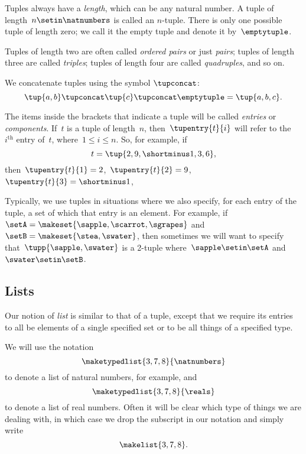 Tuples always have a \emph{length}, which can be any natural number.
A tuple of length~$n \setin \natnumbers$ is called an $n$-tuple.
There is only one possible tuple of length zero; we call it the empty tuple and denote it by~$\emptytuple$.

Tuples of length two are often called \emph{ordered pairs} or just \emph{pairs};
tuples of length three are called \emph{triples};
tuples of length four are called \emph{quadruples}, and so on.

We concatenate tuples using the symbol $\tupconcat$:
\begin{equation}
    \tup{a,b} \tupconcat \tup{c} \tupconcat \emptytuple = \tup{a,b,c}.
\end{equation}

The items inside the brackets that indicate a tuple will be called \emph{entries} or \emph{components}.
If~$t$ is a tuple of length~$n$, then~$\tupentry{t}{i}$ will refer to the~$i^{\text{th}}$ entry of~$t$, where~$1 \leq i \leq n$.
So, for example, if
\begin{equation}
    t = \tup{2,9,\shortminus1, 3, 6},
\end{equation}
then~$\tupentry{t}{1} = 2$,~$\tupentry{t}{2} = 9$,~$\tupentry{t}{3} = \shortminus1$, \etc

Typically, we use tuples in situations where we also specify, for each entry of the tuple, a set of which that entry is an element.
For example, if~$\setA = \makeset{ \sapple, \scarrot, \sgrapes}$ and~$\setB = \makeset{ \stea, \swater }$, then sometimes we will want to specify that~$\tupp{\sapple, \swater}$ is a 2-tuple where~$\sapple \setin\setA$ and~$\swater \setin\setB$.


\subsection{Lists}
\label{sec:lists}

Our notion of \emph{list} is similar to that of a tuple, except that we require its entries to all be elements of a single specified set or to be all things of a specified type.

We will use the notation
\begin{equation}
    \maketypedlist{3, 7, 8}{\natnumbers}
\end{equation}
to denote a list of natural numbers, for example, and
\begin{equation}
    \maketypedlist{3, 7, 8}{\reals}
\end{equation}
to denote a list of real numbers.
Often it will be clear which type of things we are dealing with, in which case we drop the subscript in our notation and simply write
\begin{equation}
    \makelist{3, 7, 8}.
\end{equation}

